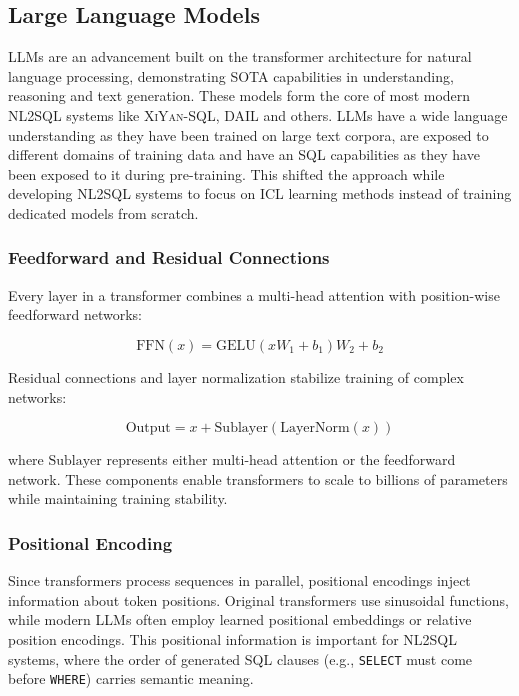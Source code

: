 \subsection{Large Language Models}

LLMs are an advancement built on the transformer architecture for natural
language processing, demonstrating SOTA capabilities in understanding,
reasoning and text generation. These models form the core of most modern NL2SQL
systems like \textsc{XiYan-SQL}, \textsc{DAIL} and others. LLMs have a wide
language understanding as they have been trained on large text corpora, are
exposed to different domains of training data and have an SQL capabilities as
they have been exposed to it during pre-training. This shifted the approach
while developing NL2SQL systems to focus on ICL learning methods instead of
training dedicated models from scratch.

\subsubsection{Feedforward and Residual Connections}

Every layer in a transformer combines a multi-head attention with position-wise
feedforward networks:

\begin{equation}
\text{FFN}(x) = \text{GELU}(xW_1 + b_1)W_2 + b_2
\end{equation}

Residual connections and layer normalization stabilize training of complex
networks:

\begin{equation}
    \text{Output} = x + \text{Sublayer}(\text{LayerNorm}(x))
\end{equation}

where $\text{Sublayer}$ represents either multi-head attention or the
feedforward network. These components enable transformers to scale to billions
of parameters while maintaining training stability.

\subsubsection{Positional Encoding}

Since transformers process sequences in parallel, positional encodings inject
information about token positions. Original transformers use sinusoidal
functions, while modern LLMs often employ learned positional embeddings or
relative position encodings. This positional information is important for
NL2SQL systems, where the order of generated SQL clauses (e.g., \texttt{SELECT}
must come before \texttt{WHERE}) carries semantic meaning.

